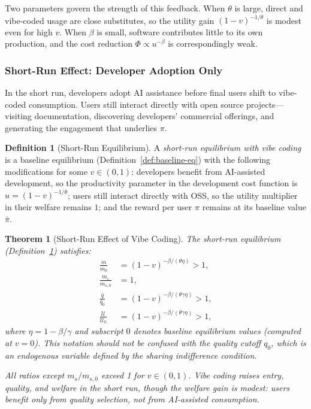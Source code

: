 \documentclass[11pt,a4paper]{article}
\newtheorem{theorem}{Theorem}
\theoremstyle{definition}
\newtheorem{definition}{Definition}
\theoremstyle{remark}
\begin{document}
Two parameters govern the strength of this feedback. When
\(\theta\) is large, direct and vibe-coded usage are close substitutes, so
the utility gain \((1-v)^{-1/\theta}\) is modest even for high \(v\).
When \(\beta\) is small, software contributes little to its own production, and the cost reduction \(\Phi \propto u^{-\beta}\) is correspondingly weak.

\subsubsection{Short-Run Effect: Developer Adoption
Only}\label{short-run-effect-developer-adoption-only}

In the short run, developers adopt AI assistance before final users
shift to vibe-coded consumption. Users still interact directly with open
source projects---visiting documentation, discovering developers'
commercial offerings, and generating the engagement that underlies
\(\pi\).

\begin{definition}[Short-Run Equilibrium]\label{def:short-run-eq}
A \emph{short-run equilibrium with vibe coding} is a baseline equilibrium (Definition~\ref{def:baseline-eq}) with the following modifications for some $v \in (0,1)$: developers benefit from AI-assisted development, so the productivity parameter in the development cost function is $u = (1-v)^{-1/\theta}$; users still interact directly with OSS, so the utility multiplier in their welfare remains $1$; and the reward per user $\pi$ remains at its baseline value $\bar{\pi}$.
\end{definition}

\begin{theorem}[Short-Run Effect of Vibe Coding]\label{thm:short-run}
The short-run equilibrium (Definition~\ref{def:short-run-eq}) satisfies:
\begin{align}
\frac{m}{m_0} &= (1-v)^{-\beta/(\theta\eta)}>1, \label{eq:m-short}\\
\frac{m_s}{m_{s,0}} &= 1, \label{eq:ms-short}\\
\frac{\bar{q}}{\bar{q}_0} &= (1-v)^{-\beta/(\theta\gamma\eta)}>1, \label{eq:qbar-short}\\
\frac{\mathcal{U}}{\mathcal{U}_0} &= (1-v)^{-\beta/(\theta\gamma\eta)}>1, \label{eq:U-short}
\end{align}
where $\eta = 1 - \beta/\gamma$ and subscript $0$ denotes baseline equilibrium values (computed at $v=0$). This notation should not be confused with the quality cutoff $q_0$, which is an endogenous variable defined by the sharing indifference condition.

All ratios except $m_s/m_{s,0}$ exceed 1 for $v \in (0,1)$. Vibe coding raises entry, quality, and welfare in the short run, though the welfare gain is modest: users benefit only from quality selection, not from AI-assisted consumption.
\end{theorem}
\end{document}
